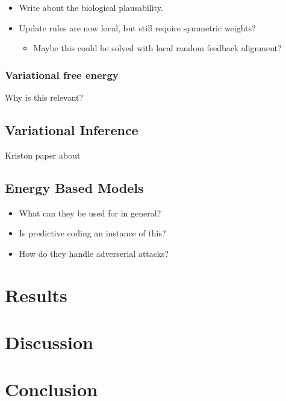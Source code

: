 \documentclass[a4paper,11pt]{article} %
\begin{document}
\begin{itemize}
  \item Write about the biological plausability.
  \item Update rules are now local, but still require symmetric weights? \begin{itemize}
    \item Maybe this could be solved with local random feedback alignment?
  \end{itemize}
\end{itemize}

\subsubsection{Variational free energy}
Why is this relevant?

\subsection{Variational Inference}
Kriston paper about 

\subsection{Energy Based Models}
\begin{itemize}
  \item What can they be used for in general?
  \item Is predictive coding an instance of this?
  \item How do they handle adverserial attacks?
\end{itemize}

\section{Results}

\section{Discussion}

\section{Conclusion}
\newpage


\end{document}

